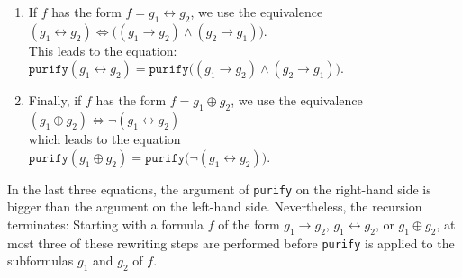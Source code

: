 \begin{enumerate}
      \\[0.2cm]
      \hspace*{1.3cm}
      $\texttt{purify}(g_1 \rightarrow g_2) = \texttt{purify}(\neg g_1 \vee g_2)$.
      \\[0.2cm]
      It is necessary to call the function \texttt{purify} on the right-hand side of the equation,
      because the operators ``$\rightarrow$'', ``$\leftrightarrow$'', and ``$\oplus$'' can still occur in
      $g_1$ and $g_2$.
\item If $f$ has the form $f = g_1 \leftrightarrow g_2$, we use the
      equivalence \\[0.2cm]
      \hspace*{1.3cm}
      $(g_1 \leftrightarrow g_2) \Leftrightarrow \bigl( (g_1 \rightarrow g_2) \wedge (g_2 \rightarrow g_1)\bigr)$.
      \\[0.2cm]
      This leads to the equation:
      \\[0.2cm]
      \hspace*{1.3cm}
      $\texttt{purify}(g_1 \leftrightarrow g_2) = \texttt{purify}\bigl( (g_1 \rightarrow g_2) \wedge (g_2 \rightarrow g_1)\bigr)$.
\item Finally, if $f$ has the form $f = g_1 \oplus g_2$, we use the equivalence
      \\[0.2cm]
      \hspace*{1.3cm}
      $(g_1 \oplus g_2) \Leftrightarrow \neg(g_1 \leftrightarrow g_2)$
      \\[0.2cm]
      which leads to the equation
      \\[0.2cm]
      \hspace*{1.3cm}
      $\texttt{purify}(g_1 \oplus g_2) = \texttt{purify}\bigl(\neg(g_1 \leftrightarrow g_2)\bigr)$.
\end{enumerate}
In the last three equations, the argument of \texttt{purify} on the right-hand side is bigger than the
argument on the left-hand side.  Nevertheless, the recursion terminates: Starting with a formula $f$ of the form
$g_1 \rightarrow g_2$, $g_1 \leftrightarrow g_2$, or $g_1 \oplus g_2$, at most three of these rewriting steps are
performed before \texttt{purify} is applied to the subformulas $g_1$ and $g_2$ of $f$.


